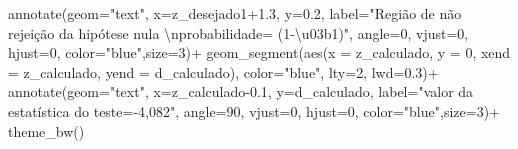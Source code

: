 \documentclass[
]{book}
\newenvironment{Shaded}{\begin{snugshade}}{\end{snugshade}}
\newcommand{\AttributeTok}[1]{\textcolor[rgb]{0.77,0.63,0.00}{#1}}
\newcommand{\DecValTok}[1]{\textcolor[rgb]{0.00,0.00,0.81}{#1}}
\newcommand{\FloatTok}[1]{\textcolor[rgb]{0.00,0.00,0.81}{#1}}
\newcommand{\FunctionTok}[1]{\textcolor[rgb]{0.00,0.00,0.00}{#1}}
\newcommand{\NormalTok}[1]{#1}
\newcommand{\SpecialCharTok}[1]{\textcolor[rgb]{0.00,0.00,0.00}{#1}}
\newcommand{\StringTok}[1]{\textcolor[rgb]{0.31,0.60,0.02}{#1}}
\begin{document}
\begin{Shaded}
\begin{Highlighting}[]
  \FunctionTok{annotate}\NormalTok{(}\AttributeTok{geom=}\StringTok{"text"}\NormalTok{, }\AttributeTok{x=}\NormalTok{z\_desejado1}\FloatTok{+1.3}\NormalTok{, }\AttributeTok{y=}\FloatTok{0.2}\NormalTok{, }\AttributeTok{label=}\StringTok{"Região de não rejeição da hipótese nula }\SpecialCharTok{\textbackslash{}n}\StringTok{probabilidade= (1{-}\textbackslash{}u03b1)"}\NormalTok{, }\AttributeTok{angle=}\DecValTok{0}\NormalTok{, }\AttributeTok{vjust=}\DecValTok{0}\NormalTok{, }\AttributeTok{hjust=}\DecValTok{0}\NormalTok{, }\AttributeTok{color=}\StringTok{"blue"}\NormalTok{,}\AttributeTok{size=}\DecValTok{3}\NormalTok{)}\SpecialCharTok{+}
  \FunctionTok{geom\_segment}\NormalTok{(}\FunctionTok{aes}\NormalTok{(}\AttributeTok{x =}\NormalTok{ z\_calculado, }\AttributeTok{y =} \DecValTok{0}\NormalTok{, }\AttributeTok{xend =}\NormalTok{ z\_calculado, }\AttributeTok{yend =}\NormalTok{ d\_calculado), }\AttributeTok{color=}\StringTok{"blue"}\NormalTok{, }\AttributeTok{lty=}\DecValTok{2}\NormalTok{, }\AttributeTok{lwd=}\FloatTok{0.3}\NormalTok{)}\SpecialCharTok{+}
  \FunctionTok{annotate}\NormalTok{(}\AttributeTok{geom=}\StringTok{"text"}\NormalTok{, }\AttributeTok{x=}\NormalTok{z\_calculado}\FloatTok{{-}0.1}\NormalTok{, }\AttributeTok{y=}\NormalTok{d\_calculado, }\AttributeTok{label=}\StringTok{"valor da estatística do teste={-}4,082"}\NormalTok{, }\AttributeTok{angle=}\DecValTok{90}\NormalTok{, }\AttributeTok{vjust=}\DecValTok{0}\NormalTok{, }\AttributeTok{hjust=}\DecValTok{0}\NormalTok{, }\AttributeTok{color=}\StringTok{"blue"}\NormalTok{,}\AttributeTok{size=}\DecValTok{3}\NormalTok{)}\SpecialCharTok{+}
  \FunctionTok{theme\_bw}\NormalTok{()}
\end{Highlighting}
\end{Shaded}
\end{document}
